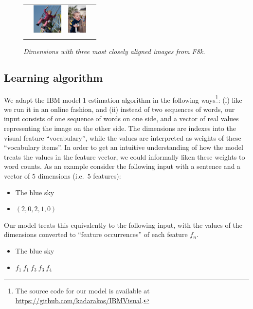 \begin{figure}
\begin{tabular}{c|lll}
     & \includegraphics[height=1.5cm]{chapters/TAL/flickr8k/3504940491_94c43792ed.jpg}
     & \includegraphics[height=1.5cm]{chapters/TAL/flickr8k/3751594676_edfbfa0688.jpg}
     \\
     & & & \\
     \hline
   \end{tabular}
   \caption{\textit{Dimensions with three most closely aligned images from F8k.}}
   \label{fig:dims}
 \end{figure}


 \subsection{Learning algorithm}
 We adapt the IBM model 1 estimation algorithm in the following
 ways\footnote{The source code for our model is available at
   \url{https://github.com/kadarakos/IBMVisual}.}: (i) like
 \citep{fazly.etal.10csj} we run it in an online fashion, and (ii)
 instead of two sequences of words, our input consists of one sequence
 of words on one side, and a vector of real values representing the
 image on the other side. The dimensions are indexes into the visual
 feature ``vocabulary'', while the values are interpreted as weights
 of these ``vocabulary items''. In order to get an intuitive
 understanding of how the model treats the values in the feature
 vector, we could informally liken these weights to word counts.  As
 an example consider the following input with a sentence and a vector
 of 5 dimensions (i.e.\ 5 features):
\begin{itemize}
\item The blue sky
\item $(2, 0, 2, 1, 0)$
\end{itemize}
Our model treats this equivalently to the following input, with the
values of the dimensions converted to ``feature occurrences'' of each
feature $f_n$.
\begin{itemize}
\item The blue sky
\item $f_1~f_1~f_3~f_3~f_4$
\end{itemize}

